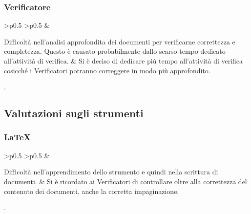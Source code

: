 \subsubsection{Verificatore}
\renewcommand{\arraystretch}{1.5}
\begin{longtable}{
    >{}p{}
        >{}p{}
}
\rowcolorhead
\centering {} &

\centering {}
\endfirsthead
\endhead
Difficoltà nell'analisi approfondita dei documenti per verificarne correttezza e completezza. Questo è causato probabilmente dallo scarso tempo dedicato all'attività di verifica. & Si è deciso di dedicare più tempo all'attività di verifica cosicché i Verificatori potranno correggere in modo più approfondito. \\
\caption{Tabella problemi verificatore}
    \end{longtable}.

\subsection{Valutazioni sugli strumenti}

\subsubsection{\LaTeX}
\renewcommand{\arraystretch}{1.5}
\begin{longtable}{
    >{}p{}
        >{}p{}
}
\rowcolorhead
\centering {} &

\centering {}
\endfirsthead
\endhead
Difficoltà nell'apprendimento dello strumento e quindi nella scrittura di documenti. & Si è ricordato ai Verificatori di controllare oltre alla correttezza del contenuto dei documenti, anche la corretta impaginazione. \\
\caption{Tabella problemi \LaTeX}
    \end{longtable}.
